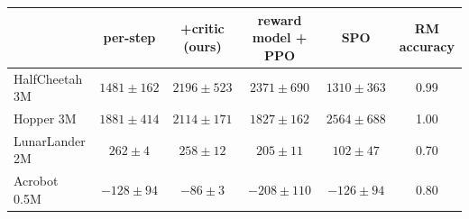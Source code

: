 \begin{tabular}{lccccc}
\toprule
 & per-step & +critic (ours) & reward model + PPO & SPO & RM accuracy \\
\midrule
HalfCheetah 3M & $1481\pm162$ & $2196\pm523$ & $2371\pm690$ & $1310\pm363$ & 0.99 \\
Hopper 3M & $1881\pm414$ & $2114\pm171$ & $1827\pm162$ & $2564\pm688$ & 1.00 \\
LunarLander 2M & $262\pm4$ & $258\pm12$ & $205\pm11$ & $102\pm47$ & 0.70 \\
Acrobot 0.5M & $-128\pm94$ & $-86\pm3$ & $-208\pm110$ & $-126\pm94$ & 0.80 \\
\bottomrule
\end{tabular}
